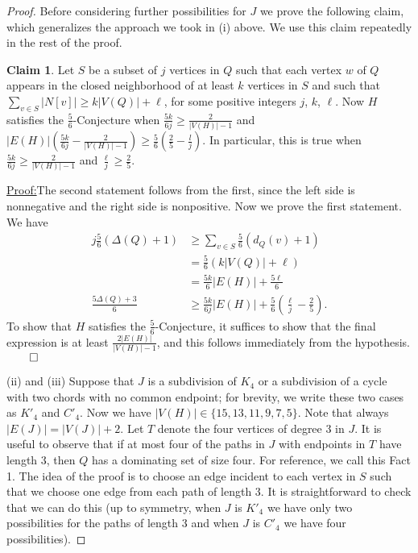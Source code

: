 \documentclass[12pt]{amsart}
\theoremstyle{plain}
\theoremstyle{definition}
\newtheorem{clm}{Claim}
\theoremstyle{remark}
\newenvironment{claimproof}[1]{\par\noindent\underline{Proof:}\space#1}{\leavevmode\unskip\penalty9999
\hbox{}\nobreak\hfill\quad\hbox{$\qed$}}
\begin{document}
\begin{proof}
Before considering further possibilities for $J$ we prove the
following claim, which generalizes the approach we took in (i) above.
We use this claim repeatedly in the rest of the proof.

\begin{clm}
Let $S$ be a subset of $j$ vertices in $Q$ such that each vertex $w$ of $Q$ appears in
the closed neighborhood of at least $k$ vertices in $S$ 
and such that $\sum_{v\in S}|N[v]|\ge k|V(Q)|+\ell$, for some positive integers
$j$, $k$, $\ell$.  Now $H$ satisfies the $\frac56$-Conjecture when $\frac{5k}{6j}\ge
\frac2{|V(H)|-1}$ and $|E(H)|(\frac{5k}{6j} - \frac2{|V(H)|-1}) \ge
\frac56\left(\frac25 - \frac{l}j\right)$.  In particular, this is true when
$\frac{5k}{6j}\ge \frac2{|V(H)|-1}$ and $\frac{\ell}{j}\ge\frac25$. 
\end{clm}
\begin{claimproof}
The second statement follows from the first, since the left side is nonnegative
and the right side is nonpositive.  Now we prove the first statement.
We have 
\begin{align*}
j\frac56(\Delta(Q)+1) &\ge \sum_{v \in S}\frac56(d_Q(v)+1)\\ 
& = \frac56(k|V(Q)|+\ell) \\ 
&= \frac{5k}6|E(H)|+\frac{5\ell}6\\
\frac{5\Delta(Q)+3}6 &\ge
\frac{5k}{6j}|E(H)|+\frac{5}6\left(\frac{\ell}{j}-\frac25\right).
\end{align*}
To show that $H$ satisfies the $\frac56$-Conjecture,
it suffices to show that the final expression is at least
$\frac{2|E(H)|}{|V(H)|-1}$, and this follows immediately from the hypothesis.
\end{claimproof}


(ii) and (iii) Suppose that $J$ is a subdivision of $K_4$ or a subdivision
of a cycle with two chords with no common endpoint; for brevity, we write these
two cases as $K'_4$ and $C'_4$.  Now we have
$|V(H)|\in\{15,13,11,9,7,5\}$.  Note that always $|E(J)|=|V(J)|+2$.  Let $T$
denote the four vertices of degree 3 in $J$.
It is useful to observe that if at most four of the paths in $J$ with endpoints in
$T$ have length 3, then $Q$ has a dominating set of size four.  For reference,
we call this Fact 1.  The idea of the proof is to
choose an edge incident to each vertex in $S$ such that we choose one edge from
each path of length 3.  It is straightforward to check that we can do this (up
to symmetry, when $J$ is $K'_4$ we have only two possibilities for the paths of
length 3 and when $J$ is $C'_4$ we have four possibilities).


\end{proof}
\end{document}

